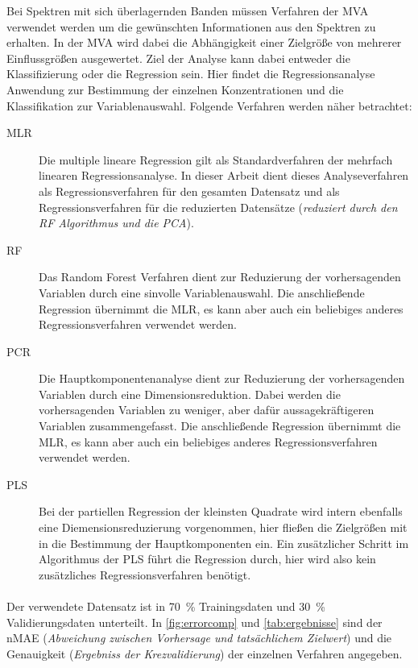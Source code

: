 Bei Spektren mit sich überlagernden Banden müssen Verfahren der \gls{MVA} verwendet werden um die gewünschten Informationen aus den Spektren zu erhalten.
In der \gls{MVA} wird dabei die Abhängigkeit einer Zielgröße von mehrerer Einflussgrößen ausgewertet.
Ziel der Analyse kann dabei entweder die Klassifizierung oder die Regression sein.
Hier findet die Regressionsanalyse Anwendung zur Bestimmung der einzelnen Konzentrationen und die Klassifikation zur Variablenauswahl.
Folgende Verfahren werden näher betrachtet:
\begin{description}
  \item[MLR] Die multiple lineare Regression gilt als Standardverfahren der mehrfach linearen Regressionsanalyse.
    In dieser Arbeit dient dieses Analyseverfahren als Regressionsverfahren für den gesamten Datensatz und als Regressionsverfahren für die reduzierten Datensätze (\emph{reduziert durch den \gls{RF} Algorithmus und die \gls{PCA}}).
  \item[RF]  Das Random Forest Verfahren dient zur Reduzierung der vorhersagenden Variablen durch eine sinvolle Variablenauswahl.
    Die anschließende Regression übernimmt die \gls{MLR}, es kann aber auch ein beliebiges anderes Regressionsverfahren verwendet werden.
  \item[PCR] Die Hauptkomponentenanalyse dient zur Reduzierung der vorhersagenden Variablen durch eine Dimensionsreduktion.
    Dabei werden die vorhersagenden Variablen zu weniger, aber dafür aussagekräftigeren Variablen zusammengefasst.
    Die anschließende Regression übernimmt die \gls{MLR}, es kann aber auch ein beliebiges anderes Regressionsverfahren verwendet werden.
  \item[PLS] Bei der partiellen Regression der kleinsten Quadrate wird intern ebenfalls eine Diemensionsreduzierung vorgenommen, hier fließen die Zielgrößen mit in die Bestimmung der Hauptkomponenten ein.
    Ein zusätzlicher Schritt im Algorithmus der \gls{PLS} führt die Regression durch, hier wird also kein zusätzliches Regressionsverfahren benötigt.
\end{description}

\paragraph{} Der verwendete Datensatz ist in \SI{70}{\percent} Trainingsdaten und \SI{30}{\percent} Validierungsdaten unterteilt.
In \cref{fig:errorcomp} und \cref{tab:ergebnisse} sind der \gls{nMAE} (\emph{Abweichung zwischen Vorhersage und tatsächlichem Zielwert}) und die Genauigkeit (\emph{Ergebniss der Krezvalidierung}) der einzelnen Verfahren angegeben.

